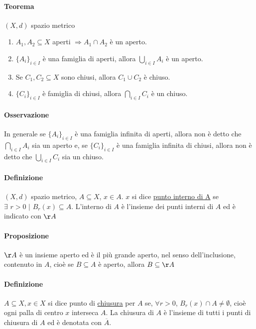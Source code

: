 \documentclass{article}
\begin{document}
\paragraph{{Teorema}}
$(X,d)$ spazio metrico
\begin{enumerate}
    \item $A_1,A_2 \subseteq X$ aperti $\Rightarrow A_1 \cap A_2$ è un aperto. 
    \item $\{A_i\}_{i\in I}$ è una famiglia di aperti, allora $\bigcup_{i\in I}A_i$ è un aperto.
    \item Se $C_1,C_2 \subseteq X$ sono chiusi, allora $C_1 \cup C_2$ è chiuso.
    \item $\{C_i\}_{i\in I}$ è famiglia di chiusi, allora $\bigcap_{i\in I} C_i$ è un chiuso.
\end{enumerate}

\paragraph{{Osservazione}}
In generale se $\{ A_i\}_{i\in I}$ è una famiglia infinita di aperti, allora non è detto che $\bigcap_{i\in I} A_i$ sia un aperto e, se $\{C_i\}_{i \in I}$ è una famiglia infinita di chiusi, allora non è detto che $\bigcup_{i\in I} C_i$ sia un chiuso. 

\paragraph{{Definizione}}
$(X,d)$ spazio metrico, $A \subseteq X$, $x \in A$. $x$ si dice \underline{punto interno di A} se $\exists \,\,r>0 \,\,|\,\,B_r(x)\subseteq A$. L'interno di $A$ è l'insieme dei punti interni di $A$ ed è indicato con $\AA$

\paragraph{{Proposizione}}
$\AA$ è un insieme aperto ed è il più grande aperto, nel senso dell'inclusione, contenuto in $A$, cioè se $B \subseteq A$ è aperto, allora $B \subseteq \AA$


\paragraph{{Definizione}}
$A \subseteq X, x \in X$ si dice punto di \underline{chiusura} per $A$ se, $\forall r>0$, $B_r(x) \cap A \neq \emptyset$, cioè ogni palla di centro $x$ interseca $A$. La chiusura di $A$ è l'insieme di tutti i punti di chiusura di $A$ ed è denotata con $\overline{A}$.
\end{document}
